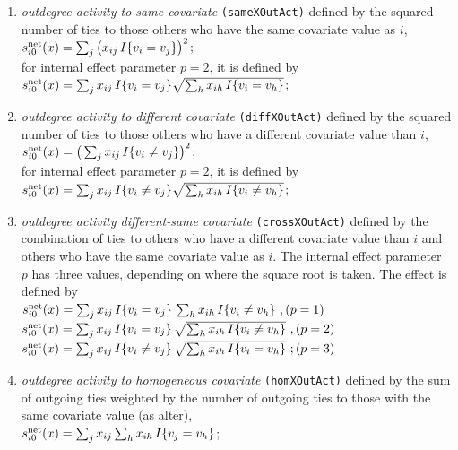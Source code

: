 \documentclass[a4paper,fleqn,11pt]{article}
\newcommand{\+}{\, + \,}
\newcommand{\vit}{\theenumi}
\begin{document}
\begin{enumerate}
 \item {\em outdegree activity to same covariate}
\texttt{(sameXOutAct)} defined by the
 squared number of ties to those
 others who have the same covariate value as $i$,\\
 $s^{\rm net}_{i\vit}(x) =  \sum_j \big(x_{ij} \, I\{v_i = v_j \}\big)^2 $;\\
 for internal effect parameter $p=2$, it is defined by\\
 $s^{\rm net}_{i\vit}(x) =  \sum_j x_{ij} \, I\{v_i = v_j \}
            \sqrt{\sum_h x_{ih}\, I\{v_i = v_h \}} $;\\

 \item {\em outdegree activity to different covariate}
\texttt{(diffXOutAct)} defined by the
 squared number of ties to those
 others who have a different covariate value than $i$,\\
 $s^{\rm net}_{i\vit}(x) = \big(\sum_j x_{ij} \,I\{v_i \neq v_j \}\big)^2 $;\\
 for internal effect parameter $p=2$, it is defined by\\
 $s^{\rm net}_{i\vit}(x) =  \sum_j x_{ij} \, I\{v_i \neq v_j \}
             \sqrt{\sum_h x_{ih}\, I\{v_i \neq v_h \}} $;\\


 \item {\em outdegree activity different-same covariate}
\texttt{(crossXOutAct)} defined by the
  combination of ties to others who have a different covariate value than $i$
  and others who have the same covariate value as $i$.
  The internal effect parameter $p$ has three values,
  depending on where the square root is taken.
  The effect is defined by \\
 $s^{\rm net}_{i\vit}(x) =  \sum_j x_{ij} \, I\{v_i = v_j \} \,
             \sum_h x_{ih}\, I\{v_i \neq v_h \} \ , \hfill (p=1) $\\[0.4em]
 $s^{\rm net}_{i\vit}(x) =  \sum_j x_{ij} \, I\{v_i = v_j \} \,
            \sqrt{ \sum_h x_{ih}\, I\{v_i \neq v_h \} } \ ,  \hfill (p=2)$\\[0.4em]
 $s^{\rm net}_{i\vit}(x) =  \sum_j x_{ij} \, I\{v_i \neq v_j \} \,
            \sqrt{ \sum_h x_{ih}\, I\{v_i = v_h \} }  \ ;  \hfill (p=3)$\\


 \item {\em outdegree activity to homogeneous covariate}
\texttt{(homXOutAct)} defined by the
 sum of outgoing ties weighted by the number of outgoing
 ties to those with the same covariate value (as alter),\\
 $s^{\rm net}_{i\vit}(x) = \sum_j x_{ij} \sum_h x_{ih} \,I\{v_j = v_h \} $;


\end{enumerate}
\end{document}
